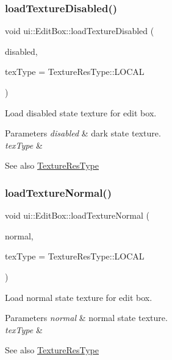 \subsubsection{\texorpdfstring{load\+Texture\+Disabled()}{loadTextureDisabled()}}
{\footnotesize\ttfamily void ui\+::\+Edit\+Box\+::load\+Texture\+Disabled (\begin{DoxyParamCaption}\item[{const std\+::string \&}]{disabled,  }\item[{\hyperlink{classui_1_1Widget_a040a65ec5ad3b11119b7e16b98bd9af0}{Texture\+Res\+Type}}]{tex\+Type = {\ttfamily TextureResType\+:\+:LOCAL} }\end{DoxyParamCaption})}

Load disabled state texture for edit box.


\begin{DoxyParams}{Parameters}
{\em disabled} & dark state texture. \\
\hline
{\em tex\+Type} & \\
\hline
\end{DoxyParams}
\begin{DoxySeeAlso}{See also}
{\ttfamily \hyperlink{classui_1_1Widget_a040a65ec5ad3b11119b7e16b98bd9af0}{Texture\+Res\+Type}} 
\end{DoxySeeAlso}
\mbox{\label{classui_1_1EditBox_a7edbd1ea73afccd9ef3797522e991211}} 
\subsubsection{\texorpdfstring{load\+Texture\+Normal()}{loadTextureNormal()}}
{\footnotesize\ttfamily void ui\+::\+Edit\+Box\+::load\+Texture\+Normal (\begin{DoxyParamCaption}\item[{const std\+::string \&}]{normal,  }\item[{\hyperlink{classui_1_1Widget_a040a65ec5ad3b11119b7e16b98bd9af0}{Texture\+Res\+Type}}]{tex\+Type = {\ttfamily TextureResType\+:\+:LOCAL} }\end{DoxyParamCaption})}

Load normal state texture for edit box.


\begin{DoxyParams}{Parameters}
{\em normal} & normal state texture. \\
\hline
{\em tex\+Type} & \\
\hline
\end{DoxyParams}
\begin{DoxySeeAlso}{See also}
{\ttfamily \hyperlink{classui_1_1Widget_a040a65ec5ad3b11119b7e16b98bd9af0}{Texture\+Res\+Type}} 
\end{DoxySeeAlso}
\mbox{\label{classui_1_1EditBox_abbe0278d18373f9d819066504aaa15ed}} 
